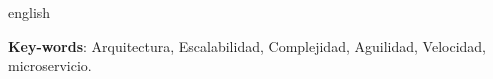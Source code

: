 \documentclass[
	article,			%
	11pt,				%
	oneside,			%
	a4paper,			%
	english,			%
	brazil,				%
	sumario=tradicional
	]{abntex2}
\begin{document}
% 








\emptythanks
\maketitle

\begin{columnaderesumen}
 \begin{otherlanguage*}{english}

   \vspace{\onelineskip}
 
   \noindent
   \textbf{Key-words}: Arquitectura, Escalabilidad, Complejidad, Aguilidad, Velocidad, microservicio.
 \end{otherlanguage*}  
\end{columnaderesumen}



\end{document}
